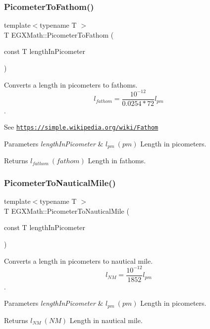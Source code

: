\subsubsection{\texorpdfstring{Picometer\+To\+Fathom()}{PicometerToFathom()}}
{\footnotesize\ttfamily template$<$typename T $>$ \\
T E\+G\+X\+Math\+::\+Picometer\+To\+Fathom (\begin{DoxyParamCaption}\item[{const T}]{length\+In\+Picometer }\end{DoxyParamCaption})}



Converts a length in picometers to fathoms. \[ l_{fathom}= \frac{10^{-12}}{0.0254 * 72} l_{pm} \]. 

See \href{https://simple.wikipedia.org/wiki/Fathom}{\tt https\+://simple.\+wikipedia.\+org/wiki/\+Fathom} 
\begin{DoxyParams}{Parameters}
{\em length\+In\+Picometer} & $ l_{pm}\ (pm)$ Length in picometers. \\
\hline
\end{DoxyParams}
\begin{DoxyReturn}{Returns}
$ l_{fathom}\ (fathom)$ Length in fathoms. 
\end{DoxyReturn}
\mbox{\label{group___e_g_x_math-_conversions-_length_conversions-_s_i-_picometer-_nautical_ga7127ef6c7c68736b7a24d2c65b8ac858}} 
\subsubsection{\texorpdfstring{Picometer\+To\+Nautical\+Mile()}{PicometerToNauticalMile()}}
{\footnotesize\ttfamily template$<$typename T $>$ \\
T E\+G\+X\+Math\+::\+Picometer\+To\+Nautical\+Mile (\begin{DoxyParamCaption}\item[{const T}]{length\+In\+Picometer }\end{DoxyParamCaption})}



Converts a length in picometers to nautical mile. \[ l_{NM}= \frac{10^{-12}}{1852} l_{pm} \]. 


\begin{DoxyParams}{Parameters}
{\em length\+In\+Picometer} & $ l_{pm}\ (pm)$ Length in picometers. \\
\hline
\end{DoxyParams}
\begin{DoxyReturn}{Returns}
$ l_{NM}\ (NM)$ Length in nautical mile. 
\end{DoxyReturn}
